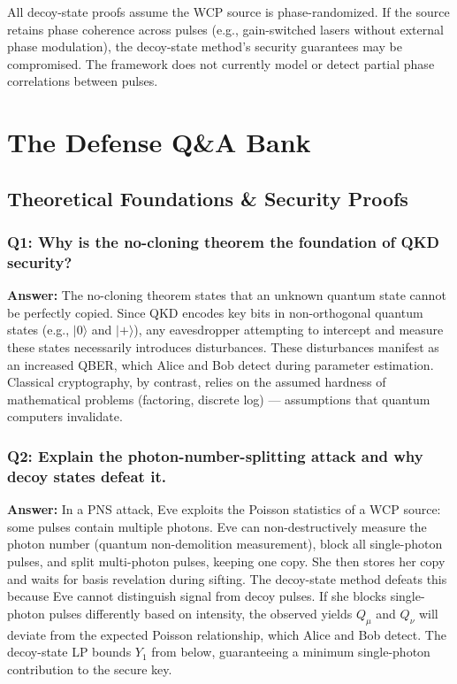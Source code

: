 \documentclass[11pt,a4paper,oneside]{report}
\begin{document}
All decoy-state proofs assume the WCP source is phase-randomized. If the source retains phase coherence across pulses (e.g., gain-switched lasers without external phase modulation), the decoy-state method's security guarantees may be compromised. The framework does not currently model or detect partial phase correlations between pulses.


\chapter{The Defense Q\&A Bank}

\section{Theoretical Foundations \& Security Proofs}

\subsection*{Q1: Why is the no-cloning theorem the foundation of QKD security?}
\textbf{Answer:} The no-cloning theorem states that an unknown quantum state cannot be perfectly copied. Since QKD encodes key bits in non-orthogonal quantum states (e.g., $|0\rangle$ and $|+\rangle$), any eavesdropper attempting to intercept and measure these states necessarily introduces disturbances. These disturbances manifest as an increased QBER, which Alice and Bob detect during parameter estimation. Classical cryptography, by contrast, relies on the assumed hardness of mathematical problems (factoring, discrete log) — assumptions that quantum computers invalidate.

\subsection*{Q2: Explain the photon-number-splitting attack and why decoy states defeat it.}
\textbf{Answer:} In a PNS attack, Eve exploits the Poisson statistics of a WCP source: some pulses contain multiple photons. Eve can non-destructively measure the photon number (quantum non-demolition measurement), block all single-photon pulses, and split multi-photon pulses, keeping one copy. She then stores her copy and waits for basis revelation during sifting. The decoy-state method defeats this because Eve cannot distinguish signal from decoy pulses. If she blocks single-photon pulses differently based on intensity, the observed yields $Q_\mu$ and $Q_\nu$ will deviate from the expected Poisson relationship, which Alice and Bob detect. The decoy-state LP bounds $Y_1$ from below, guaranteeing a minimum single-photon contribution to the secure key.
\end{document}

